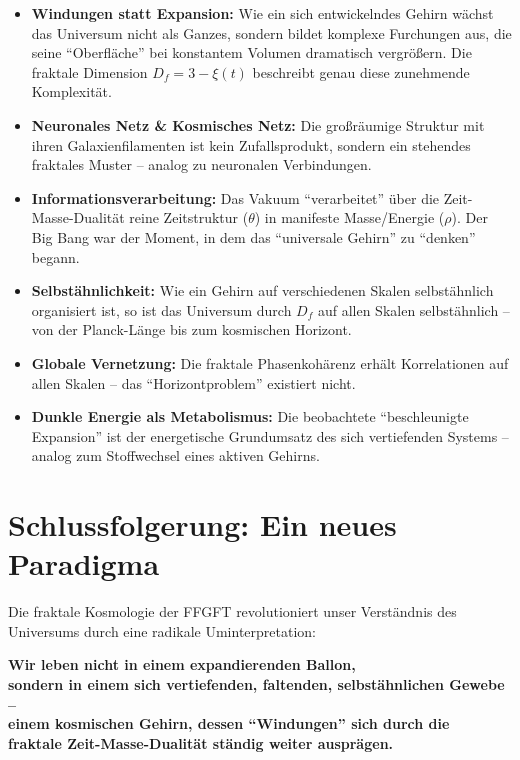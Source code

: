 \begin{itemize}[leftmargin=*]
\item \textbf{Windungen statt Expansion:} Wie ein sich entwickelndes Gehirn wächst das Universum nicht als Ganzes, sondern bildet komplexe Furchungen aus, die seine \enquote{Oberfläche} bei konstantem Volumen dramatisch vergrößern. Die fraktale Dimension $D_f = 3 - \xi(t)$ beschreibt genau diese zunehmende Komplexität.

\item \textbf{Neuronales Netz \& Kosmisches Netz:} Die großräumige Struktur mit ihren Galaxienfilamenten ist kein Zufallsprodukt, sondern ein stehendes fraktales Muster -- analog zu neuronalen Verbindungen.

\item \textbf{Informationsverarbeitung:} Das Vakuum \enquote{verarbeitet} über die Zeit-Masse-Dualität reine Zeitstruktur ($\theta$) in manifeste Masse/Energie ($\rho$). Der Big Bang war der Moment, in dem das \enquote{universale Gehirn} zu \enquote{denken} begann.

\item \textbf{Selbstähnlichkeit:} Wie ein Gehirn auf verschiedenen Skalen selbstähnlich organisiert ist, so ist das Universum durch $D_f$ auf allen Skalen selbstähnlich -- von der Planck-Länge bis zum kosmischen Horizont.

\item \textbf{Globale Vernetzung:} Die fraktale Phasenkohärenz erhält Korrelationen auf allen Skalen -- das \enquote{Horizontproblem} existiert nicht.

\item \textbf{Dunkle Energie als Metabolismus:} Die beobachtete \enquote{beschleunigte Expansion} ist der energetische Grundumsatz des sich vertiefenden Systems -- analog zum Stoffwechsel eines aktiven Gehirns.
\end{itemize}

\section{Schlussfolgerung: Ein neues Paradigma}

Die fraktale Kosmologie der FFGFT revolutioniert unser Verständnis des Universums durch eine radikale Uminterpretation:

\begin{center}
\textbf{Wir leben nicht in einem expandierenden Ballon,} \\
\textbf{sondern in einem sich vertiefenden, faltenden, selbstähnlichen Gewebe --} \\
\textbf{einem kosmischen Gehirn, dessen \enquote{Windungen} sich durch die} \\
\textbf{fraktale Zeit-Masse-Dualität ständig weiter ausprägen.}
\end{center}

